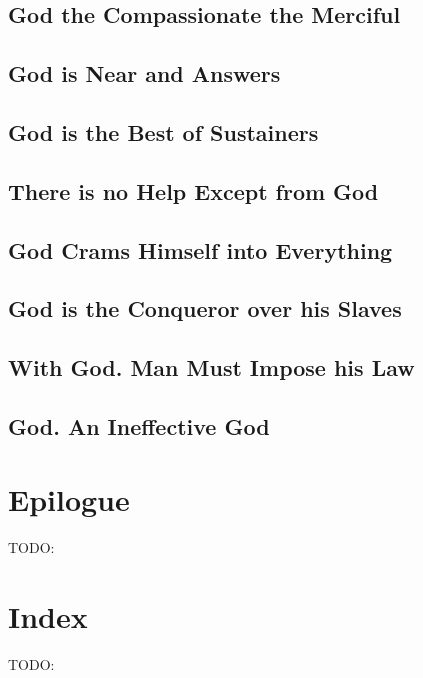\documentclass[12pt]{book}
\begin{document}
\section{God the Compassionate the Merciful}

\section{God is Near and Answers}

\section{God is the Best of Sustainers}

\section{There is no Help Except from God}

\section{God Crams Himself into Everything}

\section{God is the Conqueror over his Slaves}

\section{With God. Man Must Impose his Law}

\section{God. An Ineffective God}

\backmatter

\chapter{Epilogue}
TODO:

\chapter{Index}
TODO:
\end{document}
